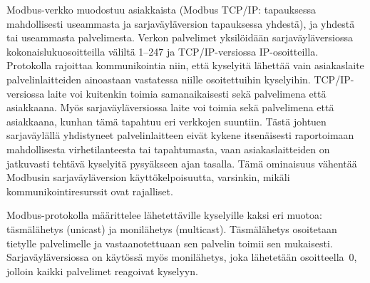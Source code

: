  Modbus-verkko muodostuu asiakkaista (Modbus TCP/IP: tapauksessa mahdollisesti useammasta ja sarjaväyläversion tapauksessa yhdestä), ja yhdestä tai useammasta palvelimesta. Verkon palvelimet yksilöidään sarjaväyläversiossa kokonaislukuosoitteilla väliltä 1--247 ja TCP/IP-versiossa IP-osoitteilla.  Protokolla rajoittaa kommunikointia niin, että kyselyitä lähettää vain asiakaslaite palvelinlaitteiden ainoastaan vastatessa niille osoitettuihin kyselyihin. TCP/IP-versiossa laite voi kuitenkin toimia samanaikaisesti sekä palvelimena että asiakkaana. \parencite{modbusSerialSpec, modbusTCPIPSpec} Myös sarjaväyläversiossa laite voi toimia sekä palvelimena että asiakkaana, kunhan tämä tapahtuu eri verkkojen suuntiin. \parencite{DincerRosen} Tästä johtuen sarjaväylällä yhdistyneet palvelinlaitteen eivät kykene itsenäisesti raportoimaan mahdollisesta virhetilanteesta tai tapahtumasta, vaan asiakaslaitteiden on jatkuvasti tehtävä kyselyitä pysyäkseen ajan tasalla. Tämä ominaisuus vähentää Modbusin sarjaväyläversion käyttökelpoisuutta, varsinkin, mikäli kommunikointiresurssit ovat rajalliset.

  Modbus-protokolla määrittelee lähetettäville kyselyille kaksi eri muotoa: täsmälähetys (unicast) ja monilähetys (multicast). Täsmälähetys osoitetaan tietylle palvelimelle ja vastaanotettuaan sen palvelin toimii sen mukaisesti. Sarjaväyläversiossa on käytössä myös monilähetys, joka lähetetään osoitteella~0, jolloin kaikki palvelimet reagoivat kyselyyn. \parencite{modbusSerialSpec}

